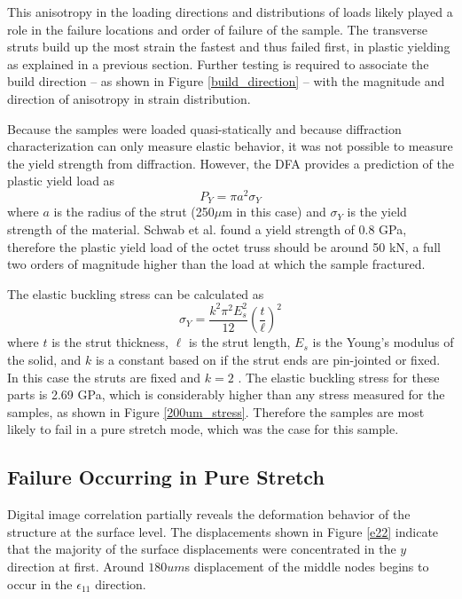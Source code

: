 This anisotropy in the loading directions and distributions of loads likely played a role in the failure locations and order of failure of the sample. The transverse struts build up the most strain the fastest and thus failed first, in plastic yielding as explained in a previous section. Further testing is required to associate the build direction -- as shown in Figure \ref{build_direction} -- with the magnitude and direction of anisotropy in strain distribution. 

Because the samples were loaded quasi-statically and because diffraction characterization can only measure elastic behavior, it was not possible to measure the yield strength from diffraction. However, the DFA provides a prediction of the plastic yield load as
\begin{equation}
	P_Y = \pi a^2\sigma_Y
	\label{yield}
\end{equation}
where $a$ is the radius of the strut (250$\mu$m in this case) and $\sigma_Y$ is the yield strength of the material. Schwab et al. found a yield strength of 0.8 GPa, therefore the plastic yield load of the octet truss should be around 50 kN, a full two orders of magnitude higher than the load at which the sample fractured. 

The elastic buckling stress can be calculated as
\begin{equation}
	\sigma_Y = \frac{k^2\pi^2E_s^2}{12}\left(\frac{t}{\ell}\right)^2
	\label{bucklingstress}
\end{equation}
where $t$ is the strut thickness, $\ell$ is the strut length, $E_s$ is the Young's modulus of the solid, and $k$ is a constant based on if the strut ends are pin-jointed or fixed. In this case the struts are fixed and $k=2$ \cite{Dong2015}. The elastic buckling stress for these parts is 2.69 GPa, which is considerably higher than any stress measured for the samples, as shown in Figure \ref{200um_stress}. Therefore the samples are most likely to fail in a pure stretch mode, which was the case for this sample.

\subsection{Failure Occurring in Pure Stretch}
Digital image correlation partially reveals the deformation behavior of the structure at the surface level. The displacements shown in Figure \ref{e22} indicate that the majority of the surface displacements were concentrated in the $y$ direction at first. Around $180um$s displacement of the middle nodes begins to occur in the $\epsilon_{11}$ direction. 

